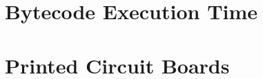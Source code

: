 \chapter{Bytecode Execution Time} \label{appx:bytecode}


%

%


\chapter{Printed Circuit Boards} \label{appx:boards}



%




\printindex

%



